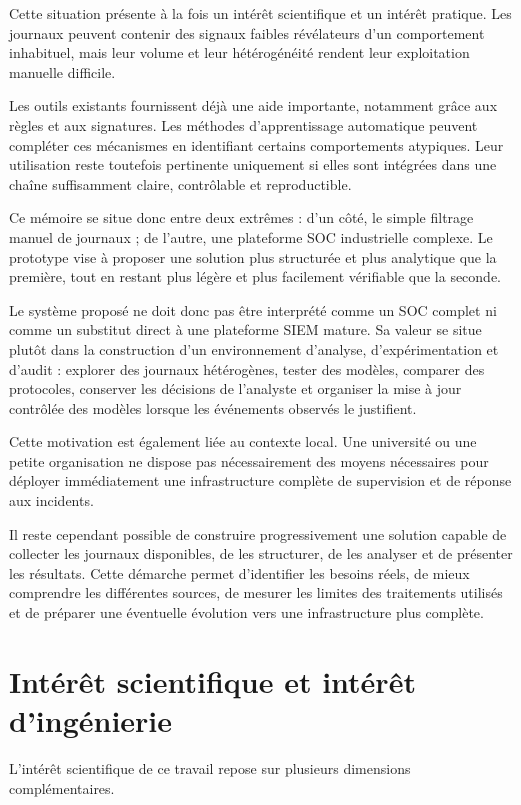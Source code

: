 Cette situation présente à la fois un intérêt scientifique et un intérêt pratique. Les journaux peuvent contenir des signaux faibles révélateurs d'un comportement inhabituel, mais leur volume et leur hétérogénéité rendent leur exploitation manuelle difficile.

Les outils existants fournissent déjà une aide importante, notamment grâce aux règles et aux signatures. Les méthodes d'apprentissage automatique peuvent compléter ces mécanismes en identifiant certains comportements atypiques. Leur utilisation reste toutefois pertinente uniquement si elles sont intégrées dans une chaîne suffisamment claire, contrôlable et reproductible.

Ce mémoire se situe donc entre deux extrêmes : d'un côté, le simple filtrage manuel de journaux ; de l'autre, une plateforme SOC industrielle complexe. Le prototype vise à proposer une solution plus structurée et plus analytique que la première, tout en restant plus légère et plus facilement vérifiable que la seconde.

Le système proposé ne doit donc pas être interprété comme un SOC complet ni comme un substitut direct à une plateforme SIEM mature. Sa valeur se situe plutôt dans la construction d'un environnement d'analyse, d'expérimentation et d'audit : explorer des journaux hétérogènes, tester des modèles, comparer des protocoles, conserver les décisions de l'analyste et organiser la mise à jour contrôlée des modèles lorsque les événements observés le justifient.

Cette motivation est également liée au contexte local. Une université ou une petite organisation ne dispose pas nécessairement des moyens nécessaires pour déployer immédiatement une infrastructure complète de supervision et de réponse aux incidents.

Il reste cependant possible de construire progressivement une solution capable de collecter les journaux disponibles, de les structurer, de les analyser et de présenter les résultats. Cette démarche permet d'identifier les besoins réels, de mieux comprendre les différentes sources, de mesurer les limites des traitements utilisés et de préparer une éventuelle évolution vers une infrastructure plus complète.

\section{Intérêt scientifique et intérêt d'ingénierie}

L'intérêt scientifique de ce travail repose sur plusieurs dimensions complémentaires.

